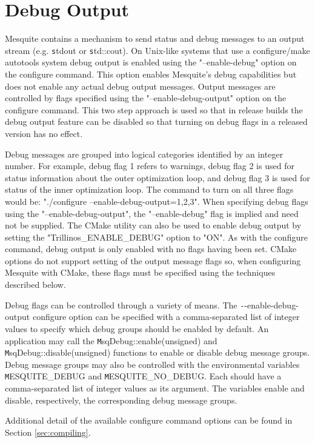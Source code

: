\section{Debug Output}

Mesquite contains a mechanism to send status and debug messages to an output stream (e.g. {\texttt stdout} or {\texttt std::cout}).  On Unix-like systems that use a configure/make autotools system debug output is enabled using the "--enable-debug" option on the configure command. This option enables Mesquite's debug capabilities but does not enable any actual debug output messages.  Output messages are controlled by flags specified using the "--enable-debug-output" option on the configure command.  This two step approach is used so that in release builds the debug output feature can be disabled so that turning on debug flags in a released version has no effect.

  Debug messages are grouped into logical categories identified by an integer number.  For example, debug flag 1 refers to warnings, debug flag 2 is used for status information about the outer optimization loop, and debug flag 3 is used for status of the inner optimization loop. The command to turn on all three flags would be: "./configure --enable-debug-output=1,2,3".  When specifying debug flags using the "--enable-debug-output", the "--enable-debug" flag is implied and need not be supplied. The CMake utility can also be used to enable debug output by setting the "Trillinos\_ENABLE\_DEBUG" option to "ON". As with the configure command, debug output is only enabled with no flags having been set. CMake options do not support setting of the output message flags so, when configuring Mesquite with CMake, these flags must be specified using the techniques described below. 

Debug flags can be controlled through a variety of means.  The {\texttt --enable-debug-output} configure option can be specified with a comma-separated list of integer values to specify which debug groups should be enabled by default.  An application may call the {\texttt MsqDebug::enable(unsigned)} and {\texttt MsqDebug::disable(unsigned)} functions to enable or disable debug message groups.  Debug message groups may also be controlled with the environmental variables {\texttt MESQUITE\_DEBUG} and {\texttt MESQUITE\_NO\_DEBUG}.	Each should have a comma-separated list of integer values as its argument.  The variables enable and disable, respectively, the corresponding debug message groups.

Additional detail of the available configure command options can be found in Section \ref{sec:compiling}.

